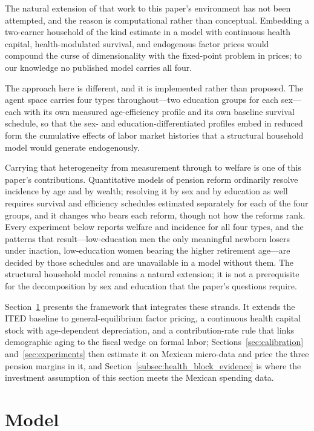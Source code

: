 \documentclass[12pt,a4paper]{article}
\begin{document}
The natural extension of that work to this paper's environment has not been
attempted, and the reason is computational rather than conceptual. Embedding a two-earner household of the kind \citet{BorellaDeNardiYang2023} estimate in a
model with continuous health capital, health-modulated survival, and endogenous
factor prices would compound the curse of dimensionality with the fixed-point
problem in prices; to our knowledge no published model carries all four.

The approach here is different, and it is implemented rather than proposed. The
agent space carries four types throughout---two education groups for each
sex---each with its own measured age-efficiency profile and its own baseline
survival schedule, so that the sex- and education-differentiated profiles embed
in reduced form the cumulative effects of labor market histories that a
structural household model would generate endogenously.

Carrying that heterogeneity from measurement through to welfare is one of this
paper's contributions. Quantitative models of pension reform ordinarily resolve
incidence by age and by wealth; resolving it by sex and by education as well
requires survival and efficiency schedules estimated separately for each of the
four groups, and it changes who bears each reform, though not how the reforms rank. Every
experiment below reports welfare and incidence for all four types, and the
patterns that result---low-education men the only meaningful newborn losers under inaction,
low-education women bearing the higher retirement age---are decided by those
schedules and are unavailable in a model without them. The structural
household model remains a natural extension; it is not a prerequisite for the
decomposition by sex and education that the paper's questions require.

\bigskip
Section~\ref{sec:model} presents the framework that integrates these strands. It
extends the ITED baseline \citep{CortesEtAl2024} to general-equilibrium factor
pricing, a continuous health capital stock with age-dependent depreciation, and
a contribution-rate rule that links demographic aging to the fiscal wedge on
formal labor; Sections~\ref{sec:calibration} and~\ref{sec:experiments} then estimate it on Mexican micro-data and price the three pension margins in it, and Section~\ref{subsec:health_block_evidence} is where the investment assumption of this section meets the Mexican spending data.

\section{Model}
\label{sec:model}
\end{document}
